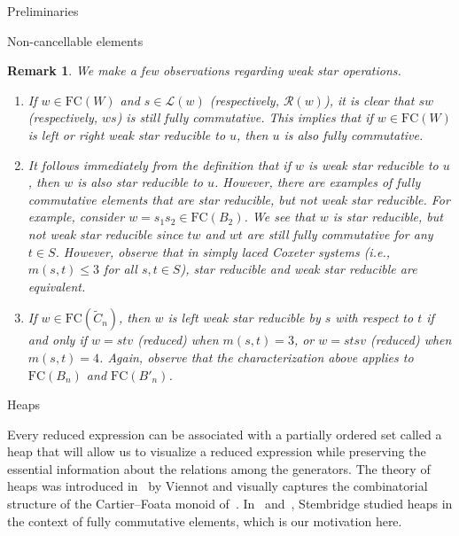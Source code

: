 \documentclass[12pt]{amsart}
\newtheorem{rem}[thm]{Remark}
\newcommand{\C}{\widetilde{C}}
\renewcommand{\L}{\mathcal{L}}
\newcommand{\R}{\mathcal{R}}
\renewcommand{\(}{\left(}
\renewcommand{\)}{\right)}
\newcommand{\FC}{\mathrm{FC}}
\begin{document}
\begin{section}{Preliminaries}
\begin{subsection}{Non-cancellable elements}
\begin{rem}
We make a few observations regarding weak star operations.
\begin{enumerate}

\item If $w\in \FC(W)$ and $s \in \L(w)$ (respectively, $\R(w)$), it is clear that $sw$ (respectively, $ws$) is still fully commutative.  This implies that if $w \in \FC(W)$ is left or right weak star reducible to $u$, then $u$ is also fully commutative.  

\item It follows immediately from the definition that if $w$ is weak star reducible to $u$, then $w$ is also star reducible to $u$.  However, there are examples of fully commutative elements that are star reducible, but not weak star reducible.  For example, consider $w=s_{1}s_{2} \in \FC(B_{2})$.  We see that $w$ is star reducible, but not weak star reducible since $tw$ and $wt$ are still fully commutative for any $t \in S$.  However, observe that in simply laced Coxeter systems (i.e., $m(s,t)\leq 3$ for all $s,t\in S$), star reducible and weak star reducible are equivalent.

\item If $w \in \FC(\C_{n})$, then $w$ is left weak star reducible by $s$ with respect to $t$ if and only if $w=stv$ (reduced) when $m(s,t)=3$, or $w=stsv$ (reduced) when $m(s,t)=4$.   Again, observe that the characterization above applies to $\FC(B_{n})$ and $\FC(B'_{n})$. 

\end{enumerate}

\end{rem}

\end{subsection}


\begin{subsection}{Heaps}\label{subsec:heaps}

Every reduced expression can be associated with a partially ordered set called a heap that will allow us to visualize a reduced expression  while preserving the essential information about the relations among the generators.  The theory of heaps was introduced in~\cite{Viennot.G:A} by Viennot and visually captures the combinatorial structure of the Cartier--Foata monoid of~\cite{Cartier.P;Foata.D:A}.  In~\cite{Stembridge.J:B} and~\cite{Stembridge.J:A}, Stembridge studied heaps in the context of fully commutative elements, which is our motivation here.  


\end{subsection}
\end{section}
\end{document}
